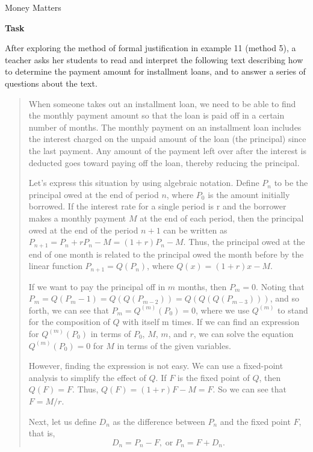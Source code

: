 \TriExample
  {
    Money Matters
  }
  {
    \textbf{Task}

    After exploring the method of formal justification in example 11 (method 5), a teacher asks her students to read and interpret the following text describing how to determine the payment amount for installment loans, and to answer a series of questions about the text.

    \begin{quote}
      When someone takes out an installment loan, we need to be able to find the monthly payment amount so that the loan is paid off in a certain number of months. The monthly payment on an installment loan includes the interest charged on the unpaid amount of the loan (the principal) since the last payment. Any amount of the payment left over after the interest is deducted goes toward paying off the loan, thereby reducing the principal.

      Let's express this situation by using algebraic notation. Define $P_n$ to be the principal owed at the end of period $n$, where $P_0$ is the amount initially borrowed. If the interest rate for a single period is r and the borrower makes a monthly payment $M$ at the end of each period, then the principal owed at the end of the period $n + 1$ can be written as $P_{n+1}=P_n+rP_n-M=(1+r)P_n-M$. Thus, the principal owed at the end of one month is related to the principal owed the month before by the linear function $P_{n+1}=Q(P_n)$, where $Q(x)=(1+r)x-M$.

      If we want to pay the principal off in $m$ months, then $P_m = 0$. Noting that $P_m=Q(P_m-1) =Q(Q(P_{m-2})) = Q(Q(Q(P_{m-3})))$, and so forth, we can see that $P_m = Q^{(m)}(P_0) = 0$, where we use $Q^{(m)}$ to stand for the composition of $Q$ with itself m times. If we can find an expression for $Q^{(m)}(P_0)$ in terms of $P_0$, $M$, $m$, and $r$, we can solve the equation $Q^{(m)}(P_0) = 0$ for $M$ in terms of the given variables.

      However, finding the expression is not easy. We can use a fixed-point analysis to simplify the effect of $Q$. If $F$ is the fixed point of $Q$, then $Q(F) = F$. Thus, $Q(F)=(1+r)F-M = F$. So we can see that $F = M/r$.\vspace{\baselineskip}

      Next, let us define $D_n$ as the difference between $P_n$ and the fixed point $F$, that is,
      $$
        D_n=P_n-F, \; \text{or} \; P_n=F+D_n.
      $$


\end{quote}}
